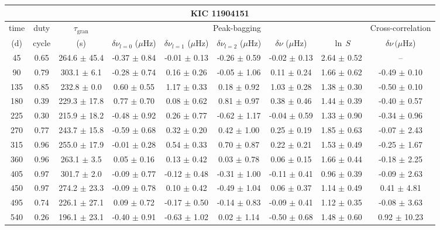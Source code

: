 \documentclass[twocolumn]{aastex61}%
\begin{document}
\begin{table*}[ht]\centering\fontsize{9.}{7.}\selectfont
\begin{tabular}{ccc|ccccc|c}
\multicolumn{9}{c}{KIC 11904151}\\ \hline\hline
time & duty & $\tau_\text{gran}$ &\multicolumn{5}{c|}{Peak-bagging}&Cross-correlation\\
(d)& cycle & (s)&$\delta\nu_{l=0}$ ($\mu$Hz) & $\delta\nu_{l=1}$ ($\mu$Hz) & $\delta\nu_{l=2}$ ($\mu$Hz) & $\delta\nu$ ($\mu$Hz)& $\ln\,S$ & $\delta\nu\,(\mu$Hz)\\\hline
45 & 0.65 & 264.6 $\pm$ 45.4 & -0.37 $\pm$ 0.84 & -0.01 $\pm$ 0.13 & -0.26 $\pm$ 0.59 & -0.02 $\pm$ 0.13 & 2.64 $\pm$ 0.52 & --\\
90 & 0.79 & 303.1 $\pm$ 6.1 & -0.28 $\pm$ 0.74 & 0.16 $\pm$ 0.26 & -0.05 $\pm$ 1.06 & 0.11 $\pm$ 0.24 & 1.66 $\pm$ 0.62 & -0.49 $\pm$ 0.10\\
135 & 0.85 & 232.8 $\pm$ 0.0 & 0.60 $\pm$ 0.55 & 1.17 $\pm$ 0.33 & 0.18 $\pm$ 0.92 & 1.03 $\pm$ 0.28 & 1.38 $\pm$ 0.30 & -0.50 $\pm$ 0.10\\
180 & 0.39 & 229.3 $\pm$ 17.8 & 0.77 $\pm$ 0.70 & 0.08 $\pm$ 0.62 & 0.81 $\pm$ 0.97 & 0.38 $\pm$ 0.46 & 1.44 $\pm$ 0.39 & -0.40 $\pm$ 0.57\\
225 & 0.30 & 215.9 $\pm$ 18.2 & -0.48 $\pm$ 0.92 & 0.26 $\pm$ 0.77 & -0.62 $\pm$ 1.17 & -0.04 $\pm$ 0.59 & 1.33 $\pm$ 0.90 & -0.34 $\pm$ 0.96\\
270 & 0.77 & 243.7 $\pm$ 15.8 & -0.59 $\pm$ 0.68 & 0.32 $\pm$ 0.20 & 0.42 $\pm$ 1.00 & 0.25 $\pm$ 0.19 & 1.85 $\pm$ 0.63 & -0.07 $\pm$ 2.43\\
315 & 0.96 & 255.0 $\pm$ 17.9 & -0.01 $\pm$ 0.28 & 0.54 $\pm$ 0.33 & 0.70 $\pm$ 0.87 & 0.22 $\pm$ 0.21 & 1.53 $\pm$ 0.49 & -0.25 $\pm$ 1.67\\
360 & 0.96 & 263.1 $\pm$ 3.5 & 0.05 $\pm$ 0.16 & 0.13 $\pm$ 0.42 & 0.03 $\pm$ 0.78 & 0.06 $\pm$ 0.15 & 1.66 $\pm$ 0.44 & -0.18 $\pm$ 2.25\\
405 & 0.97 & 301.7 $\pm$ 2.0 & -0.09 $\pm$ 0.77 & -0.12 $\pm$ 0.48 & -0.31 $\pm$ 1.00 & -0.11 $\pm$ 0.41 & 0.96 $\pm$ 0.39 & -0.09 $\pm$ 2.63\\
450 & 0.97 & 274.2 $\pm$ 23.3 & -0.09 $\pm$ 0.78 & 0.10 $\pm$ 0.42 & -0.49 $\pm$ 1.04 & 0.06 $\pm$ 0.37 & 1.14 $\pm$ 0.49 & 0.41 $\pm$ 4.81\\
495 & 0.74 & 226.1 $\pm$ 27.1 & 0.09 $\pm$ 0.72 & -0.17 $\pm$ 0.50 & -0.14 $\pm$ 0.83 & -0.09 $\pm$ 0.41 & 1.12 $\pm$ 0.35 & -0.08 $\pm$ 3.63\\
540 & 0.26 & 196.1 $\pm$ 23.1 & -0.40 $\pm$ 0.91 & -0.63 $\pm$ 1.02 & 0.02 $\pm$ 1.14 & -0.50 $\pm$ 0.68 & 1.48 $\pm$ 0.60 & 0.92 $\pm$ 10.23\\

\end{tabular}
\end{table*}
\end{document}

